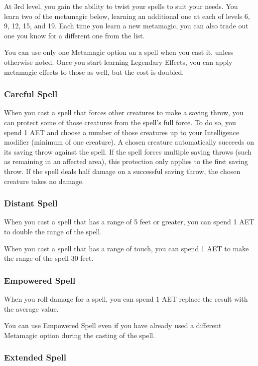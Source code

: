 At 3rd level, you gain the ability to twist your spells to suit your needs. You learn two of the metamagic below, learning an additional one at each of levels 6, 9, 12, 15, and 19. Each time you learn a new metamagic, you can also trade out one you know for a different one from the list.

You can use only one Metamagic option on a spell when you cast it, unless otherwise noted. Once you start learning Legendary Effects, you can apply metamagic effects to those as well, but the cost is doubled.

\subsubsection{Careful Spell}

When you cast a spell that forces other creatures to make a saving throw, you can protect some of those creatures from the spell's full force. To do so, you spend 1 AET and choose a number of those creatures up to your Intelligence modifier (minimum of one creature). A chosen creature automatically succeeds on its saving throw against the spell. If the spell forces multiple saving throws (such as remaining in an affected area), this protection only applies to the first saving throw. If the spell deals half damage on a successful saving throw, the chosen creature takes no damage.

\subsubsection{Distant Spell}

When you cast a spell that has a range of 5 feet or greater, you can spend 1 AET to double the range of the spell.

When you cast a spell that has a range of touch, you can spend 1 AET to make the range of the spell 30 feet.

\subsubsection{Empowered Spell}

When you roll damage for a spell, you can spend 1 AET replace the result with the average value.

You can use Empowered Spell even if you have already used a different Metamagic option during the casting of the spell.

\subsubsection{Extended Spell}

